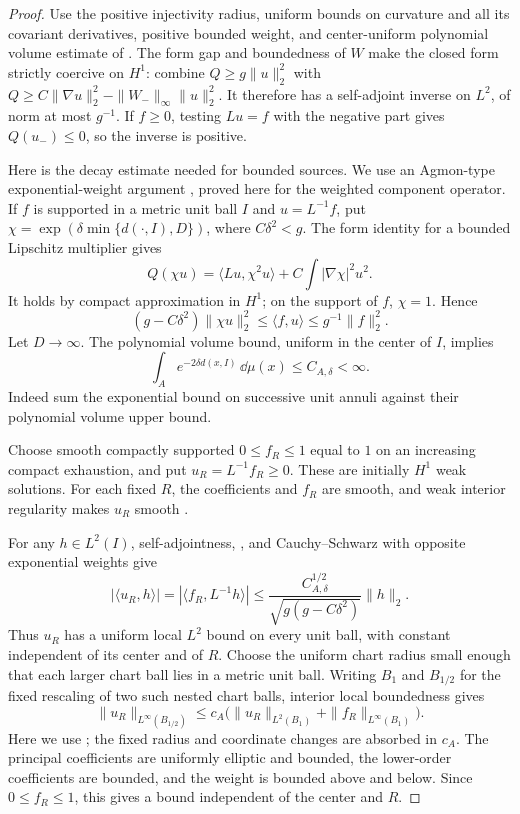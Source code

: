 \begin{proof}
Use the positive injectivity radius, uniform bounds on curvature and all
its covariant derivatives, positive bounded weight, and center-uniform
polynomial volume estimate of .  The form gap
and boundedness of $W$ make the closed form strictly coercive on $H^1$:
combine $Q\ge g\|u\|_2^2$ with
$Q\ge C\|\nabla u\|_2^2-\|W_-\|_\infty\|u\|_2^2$.
It therefore has a self-adjoint inverse on $L^2$, of norm at most
$g^{-1}$.  If $f\ge0$, testing $Lu=f$ with the negative part gives
$Q(u_-)\le0$, so the inverse is positive.

Here is the decay estimate needed for bounded sources.  We use an
Agmon-type exponential-weight argument \citep{agmon1982}, proved here
for the weighted component operator.  If $f$ is
supported in a metric unit ball $I$ and $u=L^{-1}f$, put
$\chi=\exp(\delta\min\{d(\cdot,I),D\})$, where $C\delta^2<g$.
The form identity for a bounded Lipschitz multiplier gives
\[
 Q(\chi u)=\langle Lu,\chi^2u\rangle+
                  C\int|\nabla\chi|^2u^2.
\]
It holds by compact approximation in $H^1$; on the support of $f$,
$\chi=1$.  Hence
\begin{equation}\label{regular:off-diagonal}
 (g-C\delta^2)\|\chi u\|_2^2
 \le\langle f,u\rangle\le g^{-1}\|f\|_2^2.
\end{equation}
Let $D\to\infty$.  The polynomial volume bound, uniform in the
center of $I$, implies
\[
 \int_A e^{-2\delta d(x,I)}\,\dd\mu(x)\le C_{A,\delta}<\infty.
\]
Indeed sum the exponential bound on successive unit annuli against
their polynomial volume upper bound.

Choose smooth compactly supported $0\le f_R\le1$ equal to $1$ on
an increasing compact exhaustion, and put $u_R=L^{-1}f_R\ge0$.
These are initially $H^1$ weak solutions.  For each fixed $R$, the
coefficients and $f_R$ are smooth, and weak interior regularity makes
$u_R$ smooth
\citep[Lecture~6, Theorem~1 and Corollary~1]{simonPDE}.

For any $h\in L^2(I)$, self-adjointness,
, and Cauchy--Schwarz with opposite
exponential weights give
\[
 |\langle u_R,h\rangle|
 =|\langle f_R,L^{-1}h\rangle|
 \le\frac{C_{A,\delta}^{1/2}}{\sqrt{g(g-C\delta^2)}}\|h\|_2.
\]
Thus $u_R$ has a uniform local $L^2$ bound on every unit ball, with
constant independent of its center and of $R$.  Choose the uniform
chart radius small enough that each larger chart ball lies in a
metric unit ball.  Writing $B_1$ and $B_{1/2}$ for the fixed rescaling
of two such nested chart balls, interior local boundedness gives
\[
 \|u_R\|_{L^\infty(B_{1/2})}
 \le c_A\bigl(\|u_R\|_{L^2(B_1)}
                      +\|f_R\|_{L^\infty(B_1)}\bigr).
\]
Here we use \citet[Lecture~18, Theorem~2, with $p=2$]{simonPDE};
the fixed radius and coordinate changes are absorbed in $c_A$.
The principal coefficients are
uniformly elliptic and bounded, the lower-order coefficients are
bounded, and the weight is bounded above and below.  Since
$0\le f_R\le1$, this gives a bound independent of the center and $R$.


\end{proof}
